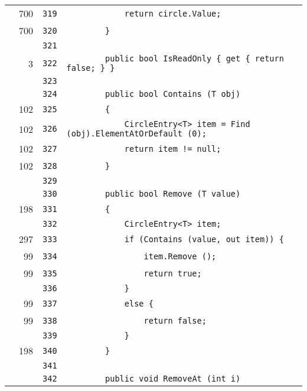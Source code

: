 \documentclass[a4paper,10pt]{article}
\begin{document}
\begin{longtable}[l]{lrrl}
\cellcolor{green} & 700 & \verb~319~ & \verb~            return circle.Value;~\\
\cellcolor{green} & 700 & \verb~320~ & \verb~        }~\\
\cellcolor{gray} &  & \verb~321~ & \verb~~\\
\cellcolor{green} & 3 & \verb~322~ & \verb~        public bool IsReadOnly { get { return false; } }~\\
\cellcolor{gray} &  & \verb~323~ & \verb~~\\
\cellcolor{gray} &  & \verb~324~ & \verb~        public bool Contains (T obj)~\\
\cellcolor{green} & 102 & \verb~325~ & \verb~        {~\\
\cellcolor{green} & 102 & \verb~326~ & \verb~            CircleEntry<T> item = Find (obj).ElementAtOrDefault (0);~\\
\cellcolor{green} & 102 & \verb~327~ & \verb~            return item != null;~\\
\cellcolor{green} & 102 & \verb~328~ & \verb~        }~\\
\cellcolor{gray} &  & \verb~329~ & \verb~~\\
\cellcolor{gray} &  & \verb~330~ & \verb~        public bool Remove (T value)~\\
\cellcolor{green} & 198 & \verb~331~ & \verb~        {~\\
\cellcolor{gray} &  & \verb~332~ & \verb~            CircleEntry<T> item;~\\
\cellcolor{green} & 297 & \verb~333~ & \verb~            if (Contains (value, out item)) {~\\
\cellcolor{green} & 99 & \verb~334~ & \verb~                item.Remove ();~\\
\cellcolor{green} & 99 & \verb~335~ & \verb~                return true;~\\
\cellcolor{gray} &  & \verb~336~ & \verb~            }~\\
\cellcolor{green} & 99 & \verb~337~ & \verb~            else {~\\
\cellcolor{green} & 99 & \verb~338~ & \verb~                return false;~\\
\cellcolor{gray} &  & \verb~339~ & \verb~            }~\\
\cellcolor{green} & 198 & \verb~340~ & \verb~        }~\\
\cellcolor{gray} &  & \verb~341~ & \verb~~\\
\cellcolor{gray} &  & \verb~342~ & \verb~        public void RemoveAt (int i)~\\

\end{longtable}
\end{document}
